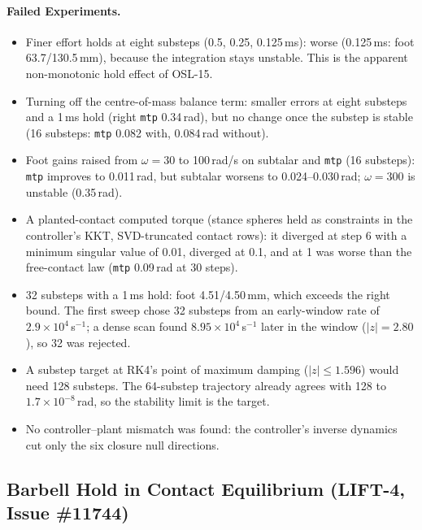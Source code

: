 \documentclass[11pt,a4paper]{article}
\begin{document}
\paragraph{Failed Experiments.}
\begin{itemize}[nosep]
\item Finer effort holds at eight substeps (0.5, 0.25, 0.125\,ms): worse
  (0.125\,ms: foot 63.7/130.5\,mm), because the integration stays unstable.
  This is the apparent non-monotonic hold effect of OSL-15.
\item Turning off the centre-of-mass balance term: smaller errors at eight
  substeps and a 1\,ms hold (right \texttt{mtp} 0.34\,rad), but no change
  once the substep is stable (16 substeps: \texttt{mtp} 0.082 with, 0.084\,rad
  without).
\item Foot gains raised from $\omega=30$ to 100\,rad/s on subtalar and
  \texttt{mtp} (16 substeps): \texttt{mtp} improves to 0.011\,rad, but
  subtalar worsens to 0.024--0.030\,rad; $\omega=300$ is unstable (0.35\,rad).
\item A planted-contact computed torque (stance spheres held as constraints
  in the controller's KKT, SVD-truncated contact rows): it diverged at step 6
  with a minimum singular value of 0.01, diverged at 0.1, and at 1 was worse
  than the free-contact law (\texttt{mtp} 0.09\,rad at 30 steps).
\item 32 substeps with a 1\,ms hold: foot 4.51/4.50\,mm, which exceeds the
  right bound. The first sweep chose 32 substeps from an early-window rate
  of $2.9\times10^4$\,s$^{-1}$; a dense scan found $8.95\times10^4$\,s$^{-1}$
  later in the window ($|z|=2.80$), so 32 was rejected.
\item A substep target at RK4's point of maximum damping ($|z|\le1.596$)
  would need 128 substeps. The 64-substep trajectory already agrees with 128
  to $1.7\times10^{-8}$\,rad, so the stability limit is the target.
\item No controller--plant mismatch was found: the controller's inverse
  dynamics cut only the six closure null directions.
\end{itemize}

\subsection{Barbell Hold in Contact Equilibrium (LIFT-4, Issue \#11744)}
\end{document}
